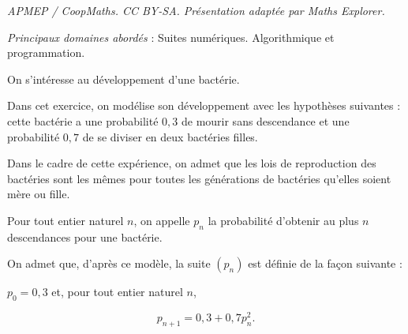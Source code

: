 \documentclass[10pt]{article}
\begin{document}
\noindent\textit{APMEP / CoopMaths. CC BY-SA. Présentation adaptée par Maths Explorer.}\par\medskip
\medskip

\emph{Principaux domaines abordés} : Suites numériques.
Algorithmique et programmation.

\bigskip

On s'intéresse au développement d'une bactérie.

Dans cet exercice, on modélise son développement avec les hypothèses suivantes : cette bactérie a une probabilité $0,3$ de mourir sans descendance et une probabilité $0,7$ de se diviser en deux bactéries filles.

Dans le cadre de cette expérience, on admet que les lois de reproduction des bactéries sont les mêmes pour toutes les générations de bactéries qu'elles soient mère ou fille.

Pour tout entier naturel $n$, on appelle $p_n$ la probabilité d'obtenir au plus $n$ descendances pour une bactérie. 

On admet que, d'après ce modèle, la suite $\left(p_n\right)$ est définie de la façon suivante :

$p_0 = 0,3$ et, pour tout entier naturel $n$,

\[p_{n+1} = 0,3 + 0,7p_n^2.\]
\end{document}

